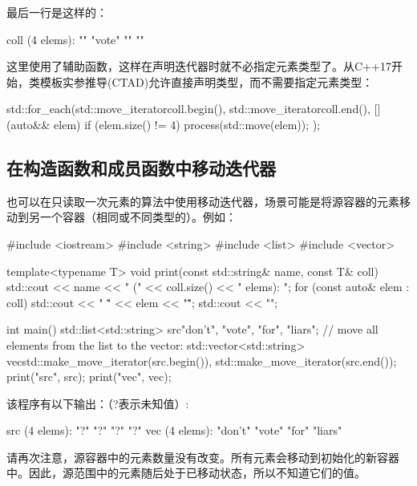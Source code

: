 最后一行是这样的：

\begin{outputcode}
coll (4 elems): "" "vote" "" ""
\end{outputcode}

这里使用了辅助函数，这样在声明迭代器时就不必指定元素类型了。从C++17开始，类模板实参推导(CTAD)允许直接声明类型，而不需要指定元素类型：

\begin{cppcode}
std::for_each(std::move_iterator{coll.begin()},
std::move_iterator{coll.end()},
[] (auto&& elem) {
	if (elem.size() != 4) {
		process(std::move(elem));
	}
});
\end{cppcode}

\subsection{在构造函数和成员函数中移动迭代器}

也可以在只读取一次元素的算法中使用移动迭代器，场景可能是将源容器的元素移动到另一个容器（相同或不同类型的）。例如：

\begin{cppcode}
#include <iostream>
#include <string>
#include <list>
#include <vector>

template<typename T>
void print(const std::string& name, const T& coll)
{
	std::cout << name << " (" << coll.size() << " elems): ";
	for (const auto& elem : coll) {
		std::cout << " \"" << elem << "\"";
	}
	std::cout << "\n";
}

int main()
{
	std::list<std::string> src{"don't", "vote", "for", "liars"};
	// move all elements from the list to the vector:
	std::vector<std::string> vec{std::make_move_iterator(src.begin()),
		std::make_move_iterator(src.end())};
	print("src", src);
	print("vec", vec);
}
\end{cppcode}

该程序有以下输出：（?表示未知值）:

\begin{outputcode}
src (4 elems): "?" "?" "?" "?"
vec (4 elems): "don't" "vote" "for" "liars"
\end{outputcode}

请再次注意，源容器中的元素数量没有改变。所有元素会移动到初始化的新容器中。因此，源范围中的元素随后处于已移动状态，所以不知道它们的值。













